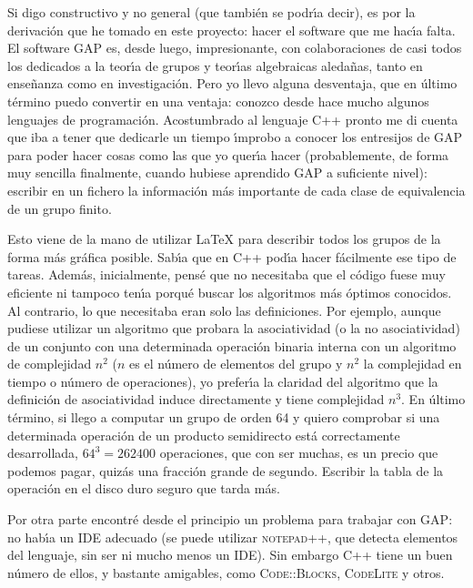 \documentclass[final,12pt,a4paper,twoside,fleqn]{extbook}
\theoremstyle{definition}
\theoremstyle{remark}
\begin{document}
Si digo constructivo y no general (que tambi\'en se podr{\'{\i}}a decir), es por la derivaci\'on que
he tomado en este proyecto: hacer el software que me hac{\'{\i}}a falta. El software GAP es, desde luego,
impresionante, con colaboraciones de casi todos los dedicados a la teor{\'{\i}}a de grupos y teor{\'{\i}}as algebraicas
aledañas, tanto en enseñanza como en investigaci\'on. Pero yo llevo alguna desventaja, que en \'ultimo
t\'ermino puedo convertir en una ventaja: conozco desde hace mucho algunos lenguajes de programaci\'on.
Acostumbrado al lenguaje C++ pronto me di cuenta que iba a tener que dedicarle un tiempo {\'{\i}}mprobo a
conocer los entresijos de GAP para poder hacer cosas como las que yo quer{\'{\i}}a hacer (probablemente, de
forma muy sencilla finalmente, cuando hubiese aprendido GAP a suficiente nivel): escribir en un fichero
la informaci\'on m\'as importante de cada clase de equivalencia de un grupo finito.

Esto viene de la mano de utilizar LaTeX para describir todos los grupos de la forma m\'as gr\'afica posible.
Sab{\'{\i}}a que en C++ pod{\'{\i}}a hacer f\'acilmente ese tipo de tareas. Adem\'as, inicialmente, pens\'e que no necesitaba
que el c\'odigo fuese muy eficiente ni tampoco ten{\'{\i}}a porqu\'e buscar los algoritmos m\'as \'optimos conocidos.
Al contrario, lo que necesitaba eran solo las definiciones. Por ejemplo, aunque pudiese utilizar un algoritmo
que probara la asociatividad (o la no asociatividad) de un conjunto con una determinada operaci\'on binaria
interna con un algoritmo de complejidad $n^2$ ($n$ es el n\'umero de elementos del grupo y $n^2$ la
complejidad en tiempo o n\'umero de operaciones), yo prefer{\'{\i}}a la
claridad del algoritmo que la definici\'on de asociatividad induce directamente y tiene complejidad $n^3$.
En \'ultimo t\'ermino, si llego a computar un grupo de orden 64 y quiero comprobar si una determinada
operaci\'on de un producto semidirecto est\'a correctamente desarrollada, $64^3=262400$ operaciones,
que con ser muchas, es un precio que podemos pagar, quiz\'as una fracci\'on grande de segundo. Escribir la tabla
de la operaci\'on en el disco duro seguro que tarda m\'as.

Por otra parte encontr\'e desde el principio un problema para trabajar con GAP: no hab{\'{\i}}a un IDE adecuado
(se puede utilizar \textsc{notepad++}, que detecta elementos del lenguaje, sin ser ni mucho menos un IDE).
Sin embargo C++ tiene un buen n\'umero de ellos, y bastante amigables, como \textsc{Code::Blocks},
\textsc{CodeLite} y otros.
\end{document}
